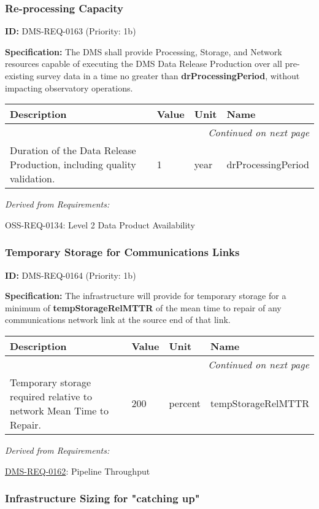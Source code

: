 \documentclass[SE,toc,lsstdraft]{lsstdoc}
\makeatletter
\newcommand{\paramname}[1]{\hspace{0pt}#1}
\newcommand{\unitname}[1]{\hspace{0pt}#1}
\newenvironment{parameters}[0]{%
\setlength\LTleft{0pt}
\setlength\LTright{\fill}
\begin{small}
\begin{longtable}[]{|p{0.49\textwidth}|l|p{0.6in}|p{1.70in}@{}|}

\hline \textbf{Description} & \textbf{Value} & \textbf{Unit} & \textbf{Name} \\ \hline
\endhead

\hline \multicolumn{4}{r}{\emph{Continued on next page}} \\
\endfoot

\hline\hline
\endlastfoot
}{%
\hline
\end{longtable}
\end{small}
}
\makeatother
\begin{document}
\subsubsection{Re-processing Capacity}

\label{DMS-REQ-0163}
\textbf{ID:} DMS-REQ-0163 (Priority: 1b)

\textbf{Specification:} The DMS shall provide Processing, Storage, and Network resources capable of executing the DMS Data Release Production over all pre-existing survey data in a time no greater than \textbf{drProcessingPeriod}, without impacting observatory operations.

\begin{parameters}
Duration of the Data Release Production, including quality validation.
&
1
&
\unitname{%
year
}
&
\paramname{%
drProcessingPeriod
} \\\hline
\end{parameters}

\emph{Derived from Requirements:}

OSS-REQ-0134:
Level 2 Data Product Availability \newline

\subsubsection{Temporary Storage for Communications Links}

\label{DMS-REQ-0164}
\textbf{ID:} DMS-REQ-0164 (Priority: 1b)

    \textbf{Specification: }The infrastructure will provide for temporary storage for a minimum of \textbf{tempStorageRelMTTR} of the mean time to repair of any communications network link at the source end of that link.

\begin{parameters}
Temporary storage required relative to network Mean Time to Repair.
&
200
&
\unitname{%
percent
}
&
\paramname{%
tempStorageRelMTTR
} \\\hline
\end{parameters}

\emph{Derived from Requirements:}

\hyperref[DMS-REQ-0162]{DMS-REQ-0162}:
Pipeline Throughput \newline

\subsubsection{Infrastructure Sizing for "catching up"}
\end{document}
